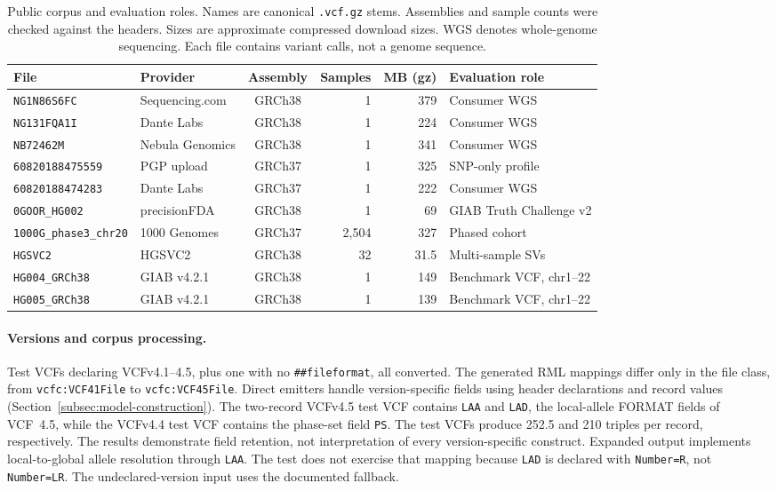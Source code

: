 \documentclass[11pt]{article}
\begin{document}
\begin{table}[!htbp]
\caption{Public corpus and evaluation roles.
Names are canonical \texttt{.vcf.gz} stems.
Assemblies and sample counts were checked against the headers.
Sizes are approximate compressed download sizes.
WGS denotes whole-genome sequencing.
Each file contains variant calls, not a genome sequence.}\label{tab:corpus}%
\centering\footnotesize\setlength{\tabcolsep}{4pt}\renewcommand{\arraystretch}{1.1}%
\begin{tabularx}{\textwidth}{@{}l l c r r >{\raggedright\arraybackslash}X@{}}
\toprule
\textbf{File} & \textbf{Provider} & \textbf{Assembly} & \textbf{Samples} & \textbf{MB (gz)} & \textbf{Evaluation role}\\
\midrule
\texttt{NG1N86S6FC}     & Sequencing.com  & GRCh38 & 1 & 379 & Consumer WGS\\
\texttt{NG131FQA1I}     & Dante Labs      & GRCh38 & 1 & 224 & Consumer WGS\\
\texttt{NB72462M}       & Nebula Genomics & GRCh38 & 1 & 341 & Consumer WGS\\
\texttt{60820188475559} & PGP upload      & GRCh37 & 1 & 325 & SNP-only profile\\
\texttt{60820188474283} & Dante Labs      & GRCh37 & 1 & 222 & Consumer WGS\\
\texttt{0GOOR\_HG002}   & precisionFDA    & GRCh38 & 1 & 69  & GIAB Truth Challenge v2\\
\texttt{1000G\_phase3\_chr20} & 1000 Genomes & GRCh37 & 2{,}504 & 327  & Phased cohort\\
\texttt{HGSVC2}               & HGSVC2       & GRCh38 & 32      & 31.5 & Multi-sample SVs\\
\texttt{HG004\_GRCh38}        & GIAB v4.2.1  & GRCh38 & 1       & 149  & Benchmark VCF, chr1--22\\
\texttt{HG005\_GRCh38}        & GIAB v4.2.1  & GRCh38 & 1       & 139  & Benchmark VCF, chr1--22\\
\bottomrule
\end{tabularx}
\end{table}

\paragraph{Versions and corpus processing.}
Test VCFs declaring VCFv4.1--4.5, plus one with no \texttt{\#\#fileformat}, all converted.
The generated RML mappings differ only in the file class, from \texttt{vcfc:VCF41File} to \texttt{vcfc:VCF45File}.
Direct emitters handle version-specific fields using header declarations and record values (Section~\ref{subsec:model-construction}).
The two-record VCFv4.5 test VCF contains \texttt{LAA} and \texttt{LAD}, the local-allele FORMAT fields of VCF~4.5, while the VCFv4.4 test VCF contains the phase-set field \texttt{PS}.
The test VCFs produce 252.5 and 210 triples per record, respectively.
The results demonstrate field retention, not interpretation of every version-specific construct.
Expanded output implements local-to-global allele resolution through \texttt{LAA}.
The test does not exercise that mapping because \texttt{LAD} is declared with \texttt{Number=R}, not \texttt{Number=LR}.
The undeclared-version input uses the documented fallback.
\end{document}
